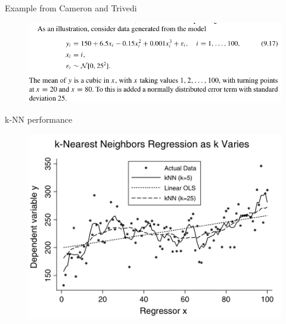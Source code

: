 \begin{frame}{Example from Cameron and Trivedi}
  \begin{figure}[htbp]
  \begin{center}
  \includegraphics[width=\textwidth]{./resources/CTsimulation}
  \label{loclinear1}
  \end{center}
  \end{figure}
  \end{frame}
  
\begin{frame}{k-NN performance}
  \begin{figure}[htbp]
  \begin{center}
  \includegraphics[width=\textwidth]{./resources/CTknn}
  \label{loclinear2}
  \end{center}
  \end{figure}
\end{frame}
    

